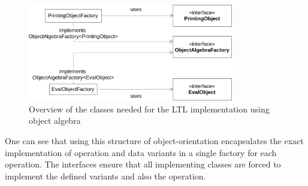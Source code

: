 \documentclass{llncs}
\begin{document}
%	


%	

\begin{figure}[h]
	\centering
	\includegraphics[width=0.8\textwidth]{img/OA-LTL-Implementation}
	\caption{Overview of the classes needed for the LTL implementation using object algebra}
	\label{fig:oa-ltl-implementation}
\end{figure} 

One can see that using this structure of object-orientation encapsulates the exact implementation of operation and data variants in a single factory for each operation. The interfaces ensure that all implementing classes are forced to implement the defined variants and also the operation. 
\end{document}
